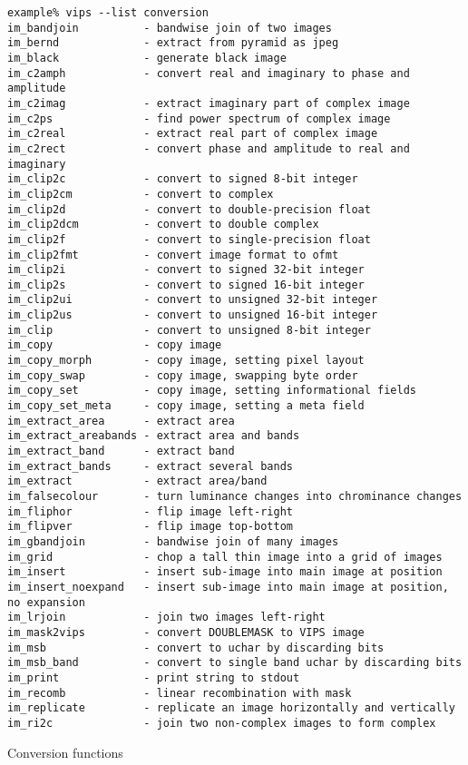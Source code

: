 \begin{fig2}
\begin{verbatim}
example% vips --list conversion
im_bandjoin          - bandwise join of two images
im_bernd             - extract from pyramid as jpeg
im_black             - generate black image
im_c2amph            - convert real and imaginary to phase and amplitude
im_c2imag            - extract imaginary part of complex image
im_c2ps              - find power spectrum of complex image
im_c2real            - extract real part of complex image
im_c2rect            - convert phase and amplitude to real and imaginary
im_clip2c            - convert to signed 8-bit integer
im_clip2cm           - convert to complex
im_clip2d            - convert to double-precision float
im_clip2dcm          - convert to double complex
im_clip2f            - convert to single-precision float
im_clip2fmt          - convert image format to ofmt
im_clip2i            - convert to signed 32-bit integer
im_clip2s            - convert to signed 16-bit integer
im_clip2ui           - convert to unsigned 32-bit integer
im_clip2us           - convert to unsigned 16-bit integer
im_clip              - convert to unsigned 8-bit integer
im_copy              - copy image
im_copy_morph        - copy image, setting pixel layout
im_copy_swap         - copy image, swapping byte order
im_copy_set          - copy image, setting informational fields
im_copy_set_meta     - copy image, setting a meta field
im_extract_area      - extract area
im_extract_areabands - extract area and bands
im_extract_band      - extract band
im_extract_bands     - extract several bands
im_extract           - extract area/band
im_falsecolour       - turn luminance changes into chrominance changes
im_fliphor           - flip image left-right
im_flipver           - flip image top-bottom
im_gbandjoin         - bandwise join of many images
im_grid              - chop a tall thin image into a grid of images
im_insert            - insert sub-image into main image at position
im_insert_noexpand   - insert sub-image into main image at position, no expansion
im_lrjoin            - join two images left-right
im_mask2vips         - convert DOUBLEMASK to VIPS image
im_msb               - convert to uchar by discarding bits
im_msb_band          - convert to single band uchar by discarding bits
im_print             - print string to stdout
im_recomb            - linear recombination with mask
im_replicate         - replicate an image horizontally and vertically
im_ri2c              - join two non-complex images to form complex
\end{verbatim}
\caption{Conversion functions}
\label{fg:conversion}
\end{fig2}

